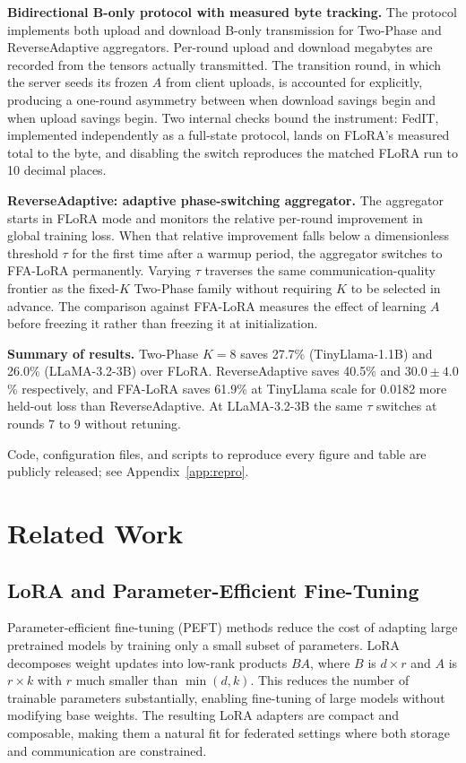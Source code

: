 \textbf{Bidirectional B-only protocol with measured byte tracking.}
The protocol implements both upload and download B-only transmission for Two-Phase and ReverseAdaptive aggregators. Per-round upload and download megabytes are recorded from the tensors actually transmitted. The transition round, in which the server seeds its frozen $A$ from client uploads, is accounted for explicitly, producing a one-round asymmetry between when download savings begin and when upload savings begin. Two internal checks bound the instrument: FedIT, implemented independently as a full-state protocol, lands on FLoRA's measured total to the byte, and disabling the switch reproduces the matched FLoRA run to 10 decimal places.

\textbf{ReverseAdaptive: adaptive phase-switching aggregator.}
The aggregator starts in FLoRA mode and monitors the relative per-round improvement in global training loss. When that relative improvement falls below a dimensionless threshold $\tau$ for the first time after a warmup period, the aggregator switches to FFA-LoRA permanently. Varying $\tau$ traverses the same communication-quality frontier as the fixed-$K$ Two-Phase family without requiring $K$ to be selected in advance. The comparison against FFA-LoRA measures the effect of learning $A$ before freezing it rather than freezing it at initialization.

\textbf{Summary of results.}
Two-Phase $K{=}8$ saves 27.7\% (TinyLlama-1.1B) and 26.0\% (LLaMA-3.2-3B) over FLoRA. ReverseAdaptive saves 40.5\% and $30.0 \pm 4.0$\% respectively, and FFA-LoRA saves 61.9\% at TinyLlama scale for 0.0182 more held-out loss than ReverseAdaptive. At LLaMA-3.2-3B the same $\tau$ switches at rounds 7 to 9 without retuning.

Code, configuration files, and scripts to reproduce every figure and table are publicly released; see Appendix~\ref{app:repro}.

\section{Related Work}
\label{sec:related}

\subsection{LoRA and Parameter-Efficient Fine-Tuning}
Parameter-efficient fine-tuning (PEFT) methods reduce the cost of adapting large pretrained models by training only a small subset of parameters. LoRA \cite{hu2022lora} decomposes weight updates into low-rank products $BA$, where $B$ is $d \times r$ and $A$ is $r \times k$ with $r$ much smaller than $\min(d,k)$. This reduces the number of trainable parameters substantially, enabling fine-tuning of large models without modifying base weights. The resulting LoRA adapters are compact and composable, making them a natural fit for federated settings where both storage and communication are constrained.

